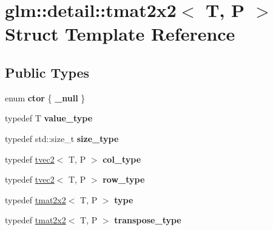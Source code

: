 \hypertarget{structglm_1_1detail_1_1tmat2x2}{}\section{glm\+:\+:detail\+:\+:tmat2x2$<$ T, P $>$ Struct Template Reference}
\label{structglm_1_1detail_1_1tmat2x2}
\subsection*{Public Types}
\begin{DoxyCompactItemize}
\item 
enum {\bfseries ctor} \{ {\bfseries \+\_\+null}
 \}\hypertarget{structglm_1_1detail_1_1tmat2x2_ac7c2fd8babbf9207cf08ffb92497a6c8}{}\label{structglm_1_1detail_1_1tmat2x2_ac7c2fd8babbf9207cf08ffb92497a6c8}

\item 
typedef T {\bfseries value\+\_\+type}\hypertarget{structglm_1_1detail_1_1tmat2x2_aa592f519609fc243aa0d63a843651a88}{}\label{structglm_1_1detail_1_1tmat2x2_aa592f519609fc243aa0d63a843651a88}

\item 
typedef std\+::size\+\_\+t {\bfseries size\+\_\+type}\hypertarget{structglm_1_1detail_1_1tmat2x2_abd8446f60873d982f61a108727193848}{}\label{structglm_1_1detail_1_1tmat2x2_abd8446f60873d982f61a108727193848}

\item 
typedef \hyperlink{structglm_1_1detail_1_1tvec2}{tvec2}$<$ T, P $>$ {\bfseries col\+\_\+type}\hypertarget{structglm_1_1detail_1_1tmat2x2_ae8c6de6197aa1b65adf15c40197c04d1}{}\label{structglm_1_1detail_1_1tmat2x2_ae8c6de6197aa1b65adf15c40197c04d1}

\item 
typedef \hyperlink{structglm_1_1detail_1_1tvec2}{tvec2}$<$ T, P $>$ {\bfseries row\+\_\+type}\hypertarget{structglm_1_1detail_1_1tmat2x2_a4c5c3a87c9c7ff8e725e928e71c7a260}{}\label{structglm_1_1detail_1_1tmat2x2_a4c5c3a87c9c7ff8e725e928e71c7a260}

\item 
typedef \hyperlink{structglm_1_1detail_1_1tmat2x2}{tmat2x2}$<$ T, P $>$ {\bfseries type}\hypertarget{structglm_1_1detail_1_1tmat2x2_a8d480bfd28c81ceebb28f78aa1fc5302}{}\label{structglm_1_1detail_1_1tmat2x2_a8d480bfd28c81ceebb28f78aa1fc5302}

\item 
typedef \hyperlink{structglm_1_1detail_1_1tmat2x2}{tmat2x2}$<$ T, P $>$ {\bfseries transpose\+\_\+type}\hypertarget{structglm_1_1detail_1_1tmat2x2_a91b971bd280c2387d22346261851033a}{}\label{structglm_1_1detail_1_1tmat2x2_a91b971bd280c2387d22346261851033a}

\end{DoxyCompactItemize}
